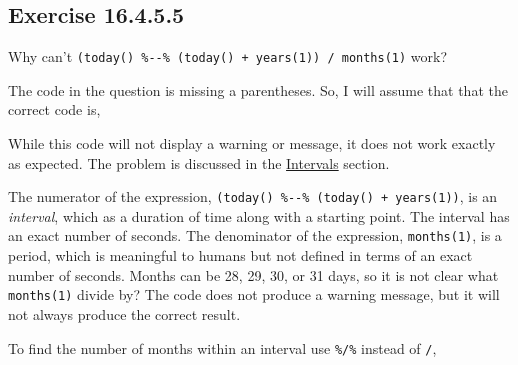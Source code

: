 \documentclass[]{book}
\newenvironment{Shaded}{\begin{snugshade}}{\end{snugshade}}
\newcommand{\CommentTok}[1]{\textcolor[rgb]{0.56,0.35,0.01}{\textit{#1}}}
\newcommand{\DecValTok}[1]{\textcolor[rgb]{0.00,0.00,0.81}{#1}}
\newcommand{\KeywordTok}[1]{\textcolor[rgb]{0.13,0.29,0.53}{\textbf{#1}}}
\newcommand{\NormalTok}[1]{#1}
\newcommand{\OperatorTok}[1]{\textcolor[rgb]{0.81,0.36,0.00}{\textbf{#1}}}
\newcommand{\StringTok}[1]{\textcolor[rgb]{0.31,0.60,0.02}{#1}}
\theoremstyle{plain}
\theoremstyle{remark}
\begin{document}
\hypertarget{exercise-16.4.5.5}{%
\subsection*{\texorpdfstring{Exercise
{16.4.5.5}}{Exercise 16.4.5.5}}\label{exercise-16.4.5.5}}

Why can't
\texttt{(today()\ \%-\/-\%\ (today()\ +\ years(1))\ /\ months(1)} work?

The code in the question is missing a parentheses. So, I will assume
that that the correct code is,

\begin{Shaded}
\end{Shaded}

While this code will not display a warning or message, it does not work
exactly as expected. The problem is discussed in the
\href{https://r4ds.had.co.nz/dates-and-times.html\#intervals}{Intervals}
section.

The numerator of the expression,
\texttt{(today()\ \%-\/-\%\ (today()\ +\ years(1))}, is an
\emph{interval}, which as a duration of time along with a starting
point. The interval has an exact number of seconds. The denominator of
the expression, \texttt{months(1)}, is a period, which is meaningful to
humans but not defined in terms of an exact number of seconds. Months
can be 28, 29, 30, or 31 days, so it is not clear what
\texttt{months(1)} divide by? The code does not produce a warning
message, but it will not always produce the correct result.

To find the number of months within an interval use \texttt{\%/\%}
instead of \texttt{/},

\begin{Shaded}
\end{Shaded}
\end{document}
